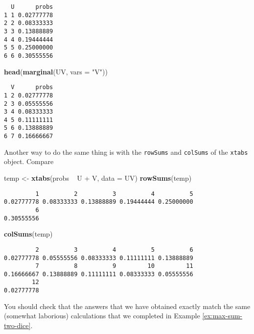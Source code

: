 \documentclass[]{book}
\newenvironment{Shaded}{\begin{snugshade}}{\end{snugshade}}
\newcommand{\KeywordTok}[1]{\textcolor[rgb]{0.13,0.29,0.53}{\textbf{{#1}}}}
\newcommand{\DataTypeTok}[1]{\textcolor[rgb]{0.13,0.29,0.53}{{#1}}}
\newcommand{\StringTok}[1]{\textcolor[rgb]{0.31,0.60,0.02}{{#1}}}
\newcommand{\NormalTok}[1]{{#1}}
\numberwithin{equation}{chapter}
\numberwithin{figure}{chapter}
\theoremstyle{plain}
\theoremstyle{definition}
\theoremstyle{remark}
\theoremstyle{definition}
\theoremstyle{definition}
\theoremstyle{remark}
\begin{document}
\begin{verbatim}
  U      probs
1 1 0.02777778
2 2 0.08333333
3 3 0.13888889
4 4 0.19444444
5 5 0.25000000
6 6 0.30555556
\end{verbatim}

\begin{Shaded}
\begin{Highlighting}[]
\KeywordTok{head}\NormalTok{(}\KeywordTok{marginal}\NormalTok{(UV, }\DataTypeTok{vars =} \StringTok{"V"}\NormalTok{))}
\end{Highlighting}
\end{Shaded}

\begin{verbatim}
  V      probs
1 2 0.02777778
2 3 0.05555556
3 4 0.08333333
4 5 0.11111111
5 6 0.13888889
6 7 0.16666667
\end{verbatim}

Another way to do the same thing is with the \texttt{rowSums} and
\texttt{colSums} of the \texttt{xtabs} object. Compare

\begin{Shaded}
\begin{Highlighting}[]
\NormalTok{temp <-}\StringTok{ }\KeywordTok{xtabs}\NormalTok{(probs ~}\StringTok{ }\NormalTok{U +}\StringTok{ }\NormalTok{V, }\DataTypeTok{data =} \NormalTok{UV)}
\KeywordTok{rowSums}\NormalTok{(temp)}
\end{Highlighting}
\end{Shaded}

\begin{verbatim}
         1          2          3          4          5 
0.02777778 0.08333333 0.13888889 0.19444444 0.25000000 
         6 
0.30555556 
\end{verbatim}

\begin{Shaded}
\begin{Highlighting}[]
\KeywordTok{colSums}\NormalTok{(temp)}
\end{Highlighting}
\end{Shaded}

\begin{verbatim}
         2          3          4          5          6 
0.02777778 0.05555556 0.08333333 0.11111111 0.13888889 
         7          8          9         10         11 
0.16666667 0.13888889 0.11111111 0.08333333 0.05555556 
        12 
0.02777778 
\end{verbatim}

You should check that the answers that we have obtained exactly match
the same (somewhat laborious) calculations that we completed in Example
\ref{ex:max-sum-two-dice}.
\end{document}
